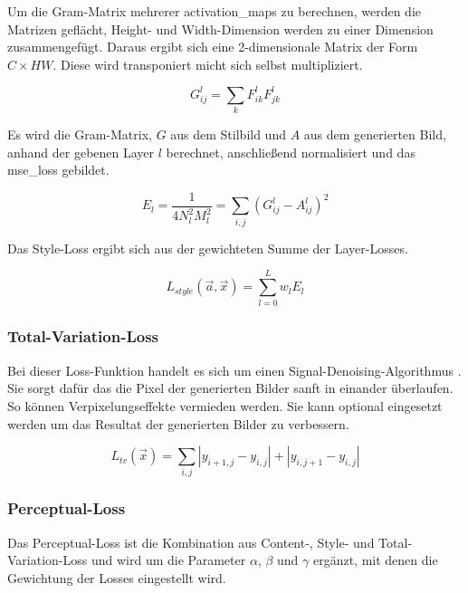 Um die Gram-Matrix mehrerer \gls{activation_map}s zu berechnen, werden die Matrizen geflächt, Height- und Width-Dimension werden zu einer Dimension zusammengefügt. Daraus ergibt sich eine 2-dimensionale Matrix der Form $ C \times HW $. Diese wird transponiert micht sich selbst multipliziert.

\begin{equation}
	\label{eq:gram_matrix_1}
	G_{ij}^{l} = \sum_{k} F_{ik}^{l} F_{jk}^{l}
\end{equation}

Es wird die Gram-Matrix, $ G $ aus dem Stilbild und $ A $ aus dem generierten Bild, anhand der gebenen Layer $ l $ berechnet, anschließend normalisiert und das \gls{mse_loss} gebildet.

\begin{equation}
	\label{eq:gram_matrix_2}
	E_{l} = \frac{1}{4N_{l}^{2} M_{l}^2} = \sum_{i, j} ( G_{ij}^{l} - A_{ij}^{l} )^2
\end{equation}

Das Style-Loss ergibt sich aus der gewichteten Summe der Layer-Losses.

\begin{equation}
	\label{eq:style_loss}
	L_{style} ( \vec{a}, \vec{x} ) = \sum_{l=0}^{L} w_{l} E_{l}
\end{equation}

\subsubsection{Total-Variation-Loss}
\label{sec:total_variation_Loss}

Bei dieser Loss-Funktion handelt es sich um einen Signal-Denoising-Algorithmus \cite{RUDIN1992259, DBLP:journals/corr/EstrelaMS16}. Sie sorgt dafür das die Pixel der generierten Bilder sanft in einander überlaufen. So können Verpixelungseffekte vermieden werden. Sie kann optional eingesetzt werden um das Resultat der generierten Bilder zu verbessern.

\begin{equation}
	\label{eq:total_variation_loss}
	L_{tv} ( \vec{x} ) = \sum_{i,j} | y_{i + 1, j} - y_{i, j} | + | y_{i, j + 1} - y_{i,j} |
\end{equation}

\subsubsection{Perceptual-Loss}
\label{sec:perceptual_loss}

Das Perceptual-Loss ist die Kombination aus Content-, Style- und Total-Variation-Loss und wird um die Parameter $ \alpha $, $ \beta $ und $ \gamma $ ergänzt, mit denen die Gewichtung der Losses eingestellt wird.

